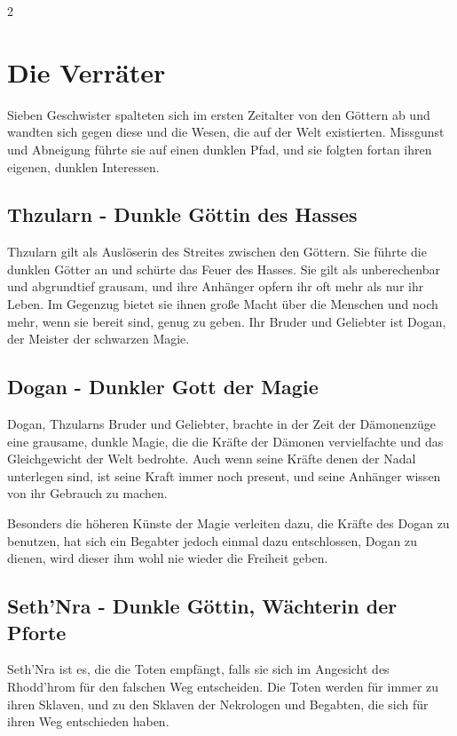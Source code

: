 \begin{multicols*}{2}
\section{Die Verräter}\label{sec:die-verrater}

Sieben Geschwister spalteten sich im ersten Zeitalter von den Göttern ab und wandten sich gegen diese und die Wesen, die auf der Welt existierten.
Missgunst und Abneigung führte sie auf einen dunklen Pfad, und sie folgten fortan ihren eigenen, dunklen Interessen.

\subsection{Thzularn - Dunkle Göttin des Hasses}\label{subsec:thzularn-dunkle-gottin-des-hasses}

Thzularn gilt als Auslöserin des Streites zwischen den Göttern.
Sie führte die dunklen Götter an und schürte das Feuer des Hasses.
Sie gilt als unberechenbar und abgrundtief grausam, und ihre Anhänger opfern ihr oft mehr als nur ihr Leben.
Im Gegenzug bietet sie ihnen große Macht über die Menschen und noch mehr, wenn sie bereit sind, genug zu geben.
Ihr Bruder und Geliebter ist Dogan, der Meister der schwarzen Magie.

\subsection{Dogan - Dunkler Gott der Magie}\label{subsec:dogan-dunkler-gott-der-magie}

Dogan, Thzularns Bruder und Geliebter, brachte in der Zeit der Dämonenzüge eine grausame, dunkle Magie, die die Kräfte der Dämonen vervielfachte und das Gleichgewicht der Welt bedrohte.
Auch wenn seine Kräfte denen der Nadal unterlegen sind, ist seine Kraft immer noch present, und seine Anhänger wissen von ihr Gebrauch zu machen.

Besonders die höheren Künste der Magie verleiten dazu, die Kräfte des Dogan zu benutzen, hat sich ein Begabter jedoch einmal dazu entschlossen, Dogan zu dienen, wird dieser ihm wohl nie wieder die Freiheit geben.

\subsection{Seth'Nra - Dunkle Göttin, Wächterin der Pforte}\label{subsec:sethnra-dunkle-gottin-wachterin-der-pforte}

Seth'Nra ist es, die die Toten empfängt, falls sie sich im Angesicht des Rhodd'hrom für den falschen Weg entscheiden.
Die Toten werden für immer zu ihren Sklaven, und zu den Sklaven der Nekrologen und Begabten, die sich für ihren Weg entschieden haben.


\end{multicols*}
